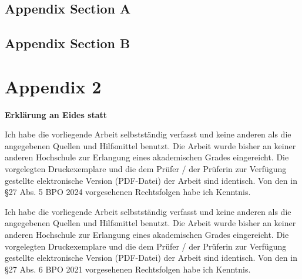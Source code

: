 \documentclass[11pt,a4paper,english,notitlepage]{report}
\begin{document}
\section{Appendix Section A}
\label{sec:appendix_1}

\section{Appendix Section B}
\label{sec:appendix_2}


\chapter{Appendix 2}
\label{chap:appendix_2}

\clearpage

{}



\clearpage

%
%
%

\thispagestyle{empty}
\label{erklaerung}

\setlength{\parindent}{0em}

\textbf{\large{Erklärung an Eides statt}}

 \vspace*{65pt}
 

Ich habe die vorliegende Arbeit selbstständig verfasst und keine anderen als die angegebenen Quellen und Hilfsmittel benutzt. Die Arbeit wurde bisher an keiner anderen Hochschule zur Erlangung eines akademischen Grades eingereicht. Die vorgelegten Druckexemplare und die dem Prüfer / der Prüferin zur Verfügung gestellte elektronische Version (PDF-Datei) der Arbeit sind identisch. Von den in §27 Abs. 5 BPO 2024 vorgesehenen Rechtsfolgen habe ich Kenntnis. 


Ich habe die vorliegende Arbeit selbstständig verfasst und keine anderen als die angegebenen Quellen und Hilfsmittel benutzt. Die Arbeit wurde bisher an keiner anderen Hochschule zur Erlangung eines akademischen Grades eingereicht. Die vorgelegten Druckexemplare und die dem Prüfer / der Prüferin zur Verfügung gestellte elektronische Version (PDF-Datei) der Arbeit sind identisch. Von den in §27 Abs. 6 BPO 2021 vorgesehenen Rechtsfolgen habe ich Kenntnis.
\end{document}

